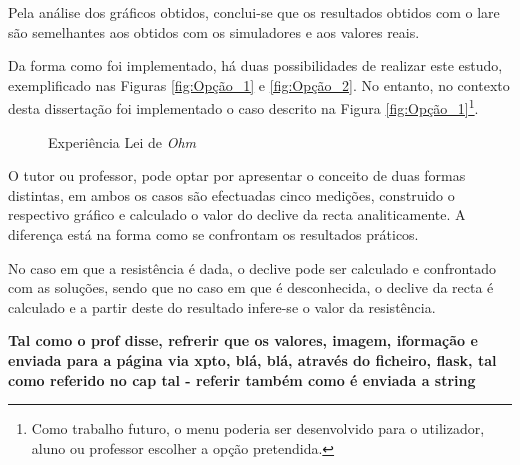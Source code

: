 Pela análise dos gráficos obtidos, conclui-se que os resultados obtidos com o \acrshort{lare} são semelhantes aos obtidos com os simuladores e aos valores reais.

Da forma como foi implementado, há duas possibilidades de realizar este estudo, exemplificado nas Figuras \ref{fig:Opção_1} e \ref{fig:Opção_2}. No entanto, no contexto desta dissertação foi  implementado o caso descrito na Figura \ref{fig:Opção_1}\footnote{Como trabalho futuro, o menu poderia ser desenvolvido para o utilizador, aluno ou professor escolher a opção pretendida.}. 

\begin{figure}[hbtp]
	\centering%
		\centering
		\qquad
		\caption{Experiência Lei de \textit{Ohm}}%
		\label{fig:experienciaOHM}%
	\end{figure}
O tutor ou professor, pode optar por apresentar o conceito de duas formas distintas, em ambos os casos são efectuadas cinco medições, construido o respectivo gráfico e calculado o valor do declive da recta analiticamente. A diferença está na forma como se confrontam os resultados práticos. 

No caso em que a resistência é dada, o declive pode ser calculado e confrontado com as soluções, sendo que no caso em que é desconhecida, o declive da recta é calculado e a partir deste do resultado infere-se o valor da resistência. 

\textbf{Tal como o prof disse, refrerir que os valores, imagem, iformação e enviada para a página via xpto, blá, blá, através do ficheiro, flask, tal como referido no cap tal - referir também como é enviada a string}

